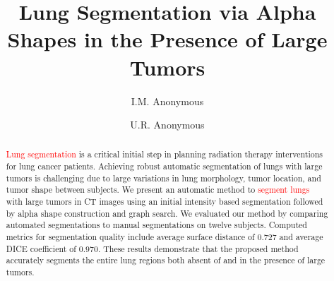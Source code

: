 \documentclass{llncs}
\begin{document}
%
\frontmatter          %
%
\pagestyle{headings}  %
%

%
%

\mainmatter              %
%
\title{Lung Segmentation via Alpha Shapes in the Presence of Large Tumors}
%
%
\author{I.M. Anonymous\\
\and U.R. Anonymous
}
%
%
%


\maketitle              %


\begin{abstract}
\textcolor{red}{Lung segmentation} is a critical initial step in planning radiation therapy interventions for lung cancer patients. Achieving robust automatic segmentation of lungs with large tumors is challenging due to large variations in lung morphology, tumor location, and tumor shape between subjects. We present an automatic method to \textcolor{red}{segment lungs} with large tumors in CT images using an initial intensity based segmentation followed by alpha shape construction and graph search. We evaluated our method by comparing automated segmentations to manual segmentations on twelve subjects. Computed metrics for segmentation quality include average surface distance of 0.727 and average DICE coefficient of 0.970. These results demonstrate that the proposed method accurately segments the entire lung regions both absent of and in the presence of large tumors. 
\end{abstract}
%
\end{document}
